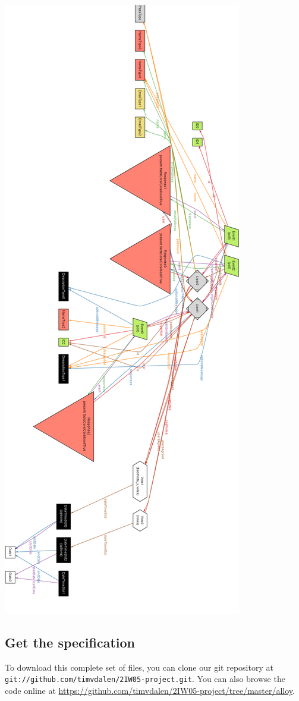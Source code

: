 		\includegraphics[width=\linewidth]{alloy/trace/vote2.png}
	
\subsection{Get the specification}
	To download this complete set of files, you can clone our git repository at \texttt{git://github.com/timvdalen/2IW05-project.git}. You can also browse the code online at \url{https://github.com/timvdalen/2IW05-project/tree/master/alloy}.
